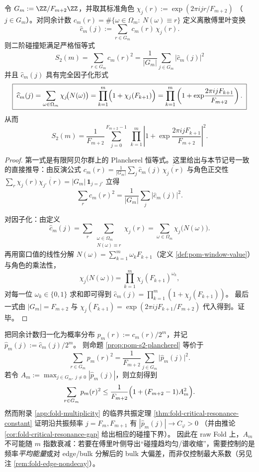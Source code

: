 \begin{proposition}\label{prop:pom-s2-plancherel}
令 \(G_m:=\ZZ/F_{m+2}\ZZ\)，并取其标准角色
\(
\chi_j(r):=\exp(2\pi i jr/F_{m+2})
\)
（\(j\in G_m\)）。对同余计数 \(c_m(r)=\#\{\omega\in\Omega_m:\ N(\omega)\equiv r\}\) 定义离散傅里叶变换
\[
\widehat c_m(j):=\sum_{r\in G_m} c_m(r)\,\chi_j(r).
\]
则二阶碰撞矩满足严格恒等式
\[
\boxed{\;
S_2(m)=\sum_{r\in G_m}c_m(r)^2=\frac{1}{|G_m|}\sum_{j\in G_m}\bigl|\widehat c_m(j)\bigr|^2\;}
\]
并且 \(\widehat c_m(j)\) 具有完全因子化形式
\[
\boxed{\;
\widehat c_m(j)=\sum_{\omega\in\Omega_m}\chi_j\!\bigl(N(\omega)\bigr)
=\prod_{k=1}^m\Bigl(1+\chi_j(F_{k+1})\Bigr)
=\prod_{k=1}^m\left(1+\exp\!\frac{2\pi i j F_{k+1}}{F_{m+2}}\right).\;}
\]
从而
\[
S_2(m)
=\frac{1}{F_{m+2}}\sum_{j=0}^{F_{m+2}-1}\ \prod_{k=1}^m\left|1+\exp\!\frac{2\pi i j F_{k+1}}{F_{m+2}}\right|^2.
\]
\end{proposition}
\begin{proof}
第一式是有限阿贝尔群上的 Plancherel 恒等式。这里给出与本节记号一致的直接推导：由反演公式
\(
c_m(r)=\frac{1}{|G_m|}\sum_{j}\widehat c_m(j)\,\overline{\chi_j(r)}
\)
与角色正交性
\(
\sum_{r}\chi_j(r)\overline{\chi_{j'}(r)}=|G_m|\,\mathbf{1}_{j=j'}
\)
立得
\[
\sum_{r}c_m(r)^2
=\frac{1}{|G_m|}\sum_{j}|\widehat c_m(j)|^2.
\]

对因子化：由定义
\[
\widehat c_m(j)
=\sum_{r}\sum_{\substack{\omega\in\Omega_m\\N(\omega)\equiv r}}\chi_j(r)
=\sum_{\omega\in\Omega_m}\chi_j\!\bigl(N(\omega)\bigr).
\]
再用窗口值的线性分解 \(N(\omega)=\sum_{k=1}^m \omega_k F_{k+1}\)（定义 \ref{def:pom-window-value}）与角色的乘法性，
\[
\chi_j\!\bigl(N(\omega)\bigr)
=\prod_{k=1}^m \chi_j(F_{k+1})^{\omega_k},
\]
对每一位 \(\omega_k\in\{0,1\}\) 求和即可得到
\(
\widehat c_m(j)=\prod_{k=1}^m(1+\chi_j(F_{k+1}))
\)。
最后一式由 \(|G_m|=F_{m+2}\) 与 \(\chi_j(F_{k+1})=\exp(2\pi i jF_{k+1}/F_{m+2})\) 代入得到。证毕。
\end{proof}

\begin{remark}[最大非平凡傅里叶系数证书与临界共振的阻碍]\label{rem:pom-max-fourier-obstruction}
把同余计数归一化为概率分布 \(p_m(r):=c_m(r)/2^m\)，并记 \(\widehat p_m(j):=\widehat c_m(j)/2^m\)。
则命题 \ref{prop:pom-s2-plancherel} 等价于
\[
\sum_{r\in G_m}p_m(r)^2=\frac{1}{F_{m+2}}\sum_{j\in G_m}\bigl|\widehat p_m(j)\bigr|^2.
\]
若令 \(A_m:=\max_{j\in G_m,\ j\neq 0}|\widehat p_m(j)|\)，则立刻得到
\[
\sum_{r\in G_m}p_m(r)^2\le \frac{1}{F_{m+2}}\Bigl(1+(F_{m+2}-1)A_m^2\Bigr).
\]
然而附录 \ref{app:fold-multiplicity} 的临界共振定理 \ref{thm:fold-critical-resonance-constant} 证明沿共振频率 \(j=F_m,F_{m+1}\) 有
\(
|\widehat p_m(j)|\to C_\varphi>0
\)
（并由推论 \ref{cor:fold-critical-resonance-gap} 给出相应的碰撞下界）。
因此在 raw Fold 上，\(A_m\) 不可能随 \(m\) 指数衰减：若要在傅里叶侧导出“碰撞趋均匀/谱收缩”，需要控制的是频率\emph{平均能量}或对 edge/bulk 分解后的 bulk 大偏差，而非仅控制最大系数（另见注 \ref{rem:fold-edge-nondecay}）。
\end{remark}

